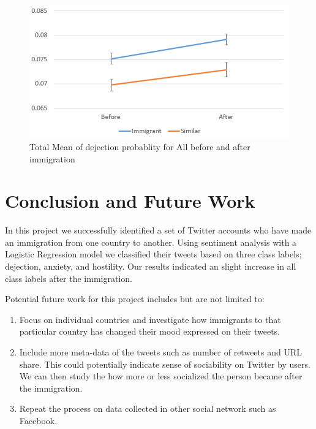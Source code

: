 \documentclass{article}
\begin{document}
\begin{figure}[ht]
\vskip 0.1in
\begin{center}
\centerline{\includegraphics[width=\columnwidth]{Figures/totalmean.PNG}}
\caption{Total Mean of dejection probablity for All before and after immigration}
\label{diffindiff}
\end{center}
\vskip -0.2in
\end{figure}



\section{Conclusion and Future Work}

In this project we successfully identified a set of Twitter accounts who have made an immigration from one country to another. Using sentiment analysis with a Logistic Regression model we classified their tweets based on three class labels; dejection, anxiety, and hostility. Our results indicated an slight increase in all class labels after the immigration. 

Potential future work for this project includes but are not limited to: 

\begin{enumerate}
    \item Focus on individual countries and investigate how immigrants to that particular country has changed their mood expressed on their tweets. 
    \item Include more meta-data of the tweets such as number of retweets and URL share. This could potentially indicate sense of sociability on Twitter by users. We can then study the how more or less socialized the person became after the immigration. 
    \item Repeat the process on data collected in other social network such as Facebook.
\end{enumerate}
\end{document}
